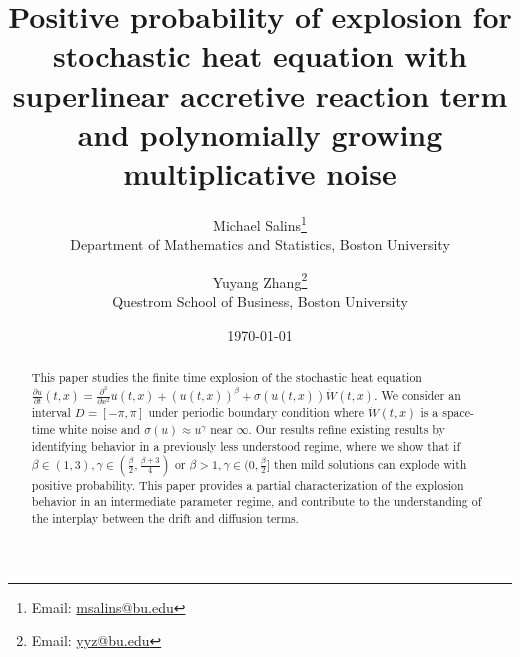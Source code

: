 \documentclass[12pt]{article}
\numberwithin{equation}{section}
\begin{document}
\begin{titlepage}
\title{Positive probability of explosion for stochastic heat equation with superlinear accretive reaction term and polynomially growing multiplicative noise}

\author{
Michael Salins\thanks{Email: \href{mailto:msalins@bu.edu}{msalins@bu.edu}} \\ 
    Department of Mathematics and Statistics, Boston University
    \and
    Yuyang Zhang\thanks{Email: \href{mailto:yyz@bu.edu}{yyz@bu.edu}} \\ 
    Questrom School of Business, Boston University 
}

\date{\today}
\maketitle
\begin{abstract}
This paper studies the finite time explosion of the stochastic heat equation $\frac{\partial u}{\partial t}(t,x)=\frac{\partial^2}{\partial x^2} u(t,x)+(u(t,x))^{\beta}+\sigma(u(t,x))\dot{W}(t,x)$. We consider an interval $D=[-\pi,\pi]$ under periodic boundary condition where $\dot{W}(t,x)$ is a space-time white noise and $\sigma(u)\approx u^{\gamma}$ near $\infty$. Our results refine existing results by identifying behavior in a previously less understood regime, where we show that if $\beta\in(1,3),\gamma\in(\frac{\beta}{2},\frac{\beta+3}{4})$ or $\beta>1,\gamma\in(0,\frac{\beta}{2}]$ then mild solutions can explode with positive probability. This paper provides a partial characterization of the explosion behavior in an intermediate parameter regime, 
and contribute to the understanding of the interplay between the drift and diffusion terms.
\end{abstract}
\setcounter{page}{0}
\thispagestyle{empty}
\end{titlepage}
\pagebreak \newpage
\end{document}
